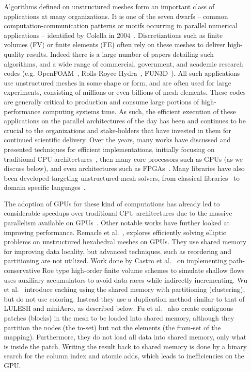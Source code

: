 \noindent
Algorithms defined on unstructured meshes form an important 
class of applications at many organizations. It is one of the seven dwarfs -- 
common computation-communication patterns or motifs occurring in parallel 
numerical applications -- identified by Colella in 2004~\cite{Colella2004}. 
Discretizations such as finite volumes (FV) or finite elements (FE) often rely 
on these meshes to deliver high-quality results. Indeed there is a large number 
of papers detailing such algorithms, and a wide range of commercial, government, 
and academic research codes (e.g. OpenFOAM~\cite{OpenFoamUserGuide}, Rolls-Royce 
Hydra~\cite{moinier2002edge}, FUN3D~\cite{biedron2017fun3d}). All such 
applications use unstructured meshes in some shape or form, and are often used 
for large experiments, consisting of millions or even billions of mesh elements. 
These codes are generally critical to production and consume large portions of 
high-performance computing systems time. As such, the efficient execution of 
these applications on the parallel architectures of the day has been and 
continues to be crucial to the organizations and stake-holders that have 
invested in them for continued scientific delivery. Over the years, many works 
have discussed and presented techniques for efficient implementations, initially 
focusing on traditional CPU architectures~\cite{mavriplis2002parallel, 
jin1999openmp}, then many-core processors such as GPUs (as we discuss below), 
and even architectures such as FPGAs~\cite{nagy2014accelerating, 
akamine2012reconfigurable}. Many libraries have also been developed targeting 
unstructured-mesh solvers, from classical libraries~\cite{trilinos, PETSc} to 
domain specific languages~\cite{devito2011liszt, giles2012op2, pyfr2016}. 

The adoption of GPUs for these kind of computations has already led to 
considerable speedups over traditional CPU architectures due to the 
massive parallelism available on GPUs~\cite{Reguly2015, ELSEN200810148, 
cohen2009fast}. Other notable works have further looked at improving 
performance. Remacle et al.\ \cite{remacle2016gpu}, explores efficiently solving 
elliptic problems on unstructured hexahedral meshes on GPUs. They use shared 
memory for improving data locality, but advanced techniques, such as reordering 
and partitioning are not utilized. Work done by Castro et al.\ 
\cite{shallow_water} on implementing path-conservative Roe type high-order 
finite volume schemes to simulate shallow flows uses auxiliary accumulators to 
avoid data races while indirectly incrementing. Wu et al.\ 
\cite{wu2013complexity} introduce caching using the shared memory with 
partitioning (clustering), but do not use coloring. Instead they use a 
duplication method similar to that of LULESH and miniAero, as described below. 
Fu et al.\ \cite{fu2014architecting} also create contiguous patches (blocks) in 
the mesh to be loaded into shared memory, although they partition the nodes (the 
to-set) but not the elements (the from-set of the mapping). Furthermore, they do 
not load all data into shared memory, only what is inside the patch. Writing the 
result back to shared memory is done by a binary search for the column index and 
atomic adds, which leads to inefficiencies on the GPU. 

